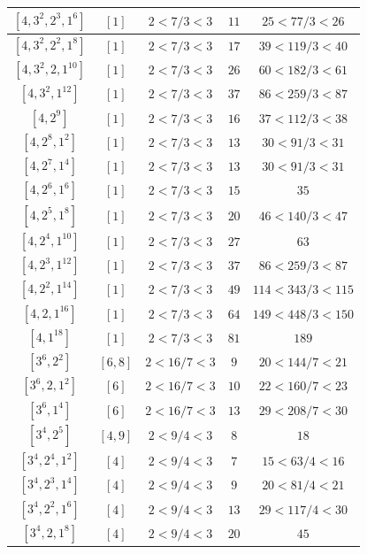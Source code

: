 \documentclass{article}%
\begin{document}
\begin{center}
\begin{longtable}{||c|c|c|c|c||}
$[4, 3^{2}, 2^{3}, 1^{6}]$ & $[1]$ & $2 < 7/3 < 3$ & $11$ & $25 < 77/3 < 26$ \\ \hline 
$[4, 3^{2}, 2^{2}, 1^{8}]$ & $[1]$ & $2 < 7/3 < 3$ & $17$ & $39 < 119/3 < 40$ \\ \hline 
$[4, 3^{2}, 2, 1^{10}]$ & $[1]$ & $2 < 7/3 < 3$ & $26$ & $60 < 182/3 < 61$ \\ \hline 
$[4, 3^{2}, 1^{12}]$ & $[1]$ & $2 < 7/3 < 3$ & $37$ & $86 < 259/3 < 87$ \\ \hline 
$[4, 2^{9}]$ & $[1]$ & $2 < 7/3 < 3$ & $16$ & $37 < 112/3 < 38$ \\ \hline 
$[4, 2^{8}, 1^{2}]$ & $[1]$ & $2 < 7/3 < 3$ & $13$ & $30 < 91/3 < 31$ \\ \hline 
$[4, 2^{7}, 1^{4}]$ & $[1]$ & $2 < 7/3 < 3$ & $13$ & $30 < 91/3 < 31$ \\ \hline 
$[4, 2^{6}, 1^{6}]$ & $[1]$ & $2 < 7/3 < 3$ & $15$ & $35$ \\ \hline 
$[4, 2^{5}, 1^{8}]$ & $[1]$ & $2 < 7/3 < 3$ & $20$ & $46 < 140/3 < 47$ \\ \hline 
$[4, 2^{4}, 1^{10}]$ & $[1]$ & $2 < 7/3 < 3$ & $27$ & $63$ \\ \hline 
$[4, 2^{3}, 1^{12}]$ & $[1]$ & $2 < 7/3 < 3$ & $37$ & $86 < 259/3 < 87$ \\ \hline 
$[4, 2^{2}, 1^{14}]$ & $[1]$ & $2 < 7/3 < 3$ & $49$ & $114 < 343/3 < 115$ \\ \hline 
$[4, 2, 1^{16}]$ & $[1]$ & $2 < 7/3 < 3$ & $64$ & $149 < 448/3 < 150$ \\ \hline 
$[4, 1^{18}]$ & $[1]$ & $2 < 7/3 < 3$ & $81$ & $189$ \\ \hline 
$[3^{6}, 2^{2}]$ & $[6, 8]$ & $2 < 16/7 < 3$ & $9$ & $20 < 144/7 < 21$ \\ \hline 
$[3^{6}, 2, 1^{2}]$ & $[6]$ & $2 < 16/7 < 3$ & $10$ & $22 < 160/7 < 23$ \\ \hline 
$[3^{6}, 1^{4}]$ & $[6]$ & $2 < 16/7 < 3$ & $13$ & $29 < 208/7 < 30$ \\ \hline 
$[3^{4}, 2^{5}]$ & $[4, 9]$ & $2 < 9/4 < 3$ & $8$ & $18$ \\ \hline 
$[3^{4}, 2^{4}, 1^{2}]$ & $[4]$ & $2 < 9/4 < 3$ & $7$ & $15 < 63/4 < 16$ \\ \hline 
$[3^{4}, 2^{3}, 1^{4}]$ & $[4]$ & $2 < 9/4 < 3$ & $9$ & $20 < 81/4 < 21$ \\ \hline 
$[3^{4}, 2^{2}, 1^{6}]$ & $[4]$ & $2 < 9/4 < 3$ & $13$ & $29 < 117/4 < 30$ \\ \hline 
$[3^{4}, 2, 1^{8}]$ & $[4]$ & $2 < 9/4 < 3$ & $20$ & $45$ \\ \hline 

\end{longtable}
\end{center}
\end{document}
